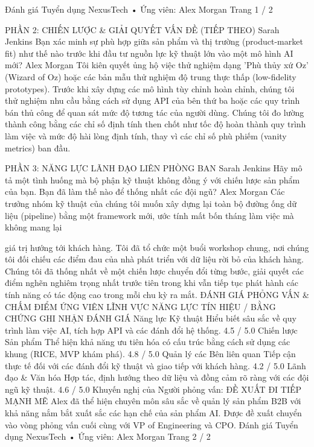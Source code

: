 \documentclass[12pt]{article}
\begin{document}
Đánh giá Tuyển dụng NexusTech • Ứng viên: Alex Morgan
Trang 1 / 2

PHẦN 2: CHIẾN LƯỢC & GIẢI QUYẾT VẤN ĐỀ (TIẾP THEO)
Sarah Jenkins
Bạn xác minh sự phù hợp giữa sản phẩm và thị trường (product-market fit) như thế nào trước khi đầu tư nguồn lực kỹ thuật lớn vào một mô hình AI mới?
Alex Morgan
Tôi kiên quyết ủng hộ việc thử nghiệm dạng 'Phù thủy xứ Oz' (Wizard of Oz) hoặc các bản mẫu thử nghiệm độ trung thực thấp (low-fidelity prototypes). Trước khi xây dựng các mô hình tùy chỉnh hoàn chỉnh, chúng tôi thử nghiệm nhu cầu bằng cách sử dụng API của bên thứ ba hoặc các quy trình bán thủ công để quan sát mức độ tương tác của người dùng. Chúng tôi đo lường thành công bằng các chỉ số định tính then chốt như tốc độ hoàn thành quy trình làm việc và mức độ hài lòng định tính, thay vì các chỉ số phù phiếm (vanity metrics) ban đầu.

PHẦN 3: NĂNG LỰC LÃNH ĐẠO LIÊN PHÒNG BAN
Sarah Jenkins
Hãy mô tả một tình huống mà bộ phận kỹ thuật không đồng ý với chiến lược sản phẩm của bạn. Bạn đã làm thế nào để thống nhất các đội ngũ?
Alex Morgan
Các trưởng nhóm kỹ thuật của chúng tôi muốn xây dựng lại toàn bộ đường ống dữ liệu (pipeline) bằng một framework mới, ước tính mất bốn tháng làm việc mà không mang lại

giá trị hướng tới khách hàng. Tôi đã tổ chức một buổi workshop chung, nơi chúng tôi đối chiếu các điểm đau của nhà phát triển với dữ liệu rời bỏ của khách hàng. Chúng tôi đã thống nhất về một chiến lược chuyển đổi từng bước, giải quyết các điểm nghẽn nghiêm trọng nhất trước tiên trong khi vẫn tiếp tục phát hành các tính năng có tác động cao trong mỗi chu kỳ ra mắt.
ĐÁNH GIÁ PHỎNG VẤN \& CHẤM ĐIỂM ỨNG VIÊN
LĨNH VỰC NĂNG LỰC
TÍN HIỆU / BẰNG CHỨNG GHI NHẬN
ĐÁNH GIÁ
Năng lực Kỹ thuật
Hiểu biết sâu sắc về quy trình làm việc AI, tích hợp API và các đánh đổi hệ thống.
4.5 /
5.0
Chiến lược Sản phẩm
Thể hiện khả năng ưu tiên hóa có cấu trúc bằng cách sử dụng các khung (RICE, MVP khám phá).
4.8 /
5.0
Quản lý các Bên liên quan
Tiếp cận thực tế đối với các đánh đổi kỹ thuật và giao tiếp với khách hàng.
4.2 /
5.0
Lãnh đạo \& Văn hóa
Hợp tác, định hướng theo dữ liệu và đồng cảm rõ ràng với các đội ngũ kỹ thuật.
4.6 /
5.0
Khuyến nghị của Người phỏng vấn: ĐỀ XUẤT ĐI TIẾP MẠNH MẼ
Alex đã thể hiện chuyên môn sâu sắc về quản lý sản phẩm B2B với khả năng nắm bắt xuất sắc các hạn chế của sản phẩm AI. Được đề xuất chuyển vào vòng phỏng vấn cuối cùng với VP of Engineering và CPO.
Đánh giá Tuyển dụng NexusTech • Ứng viên: Alex Morgan
Trang 2 / 2
\end{document}
